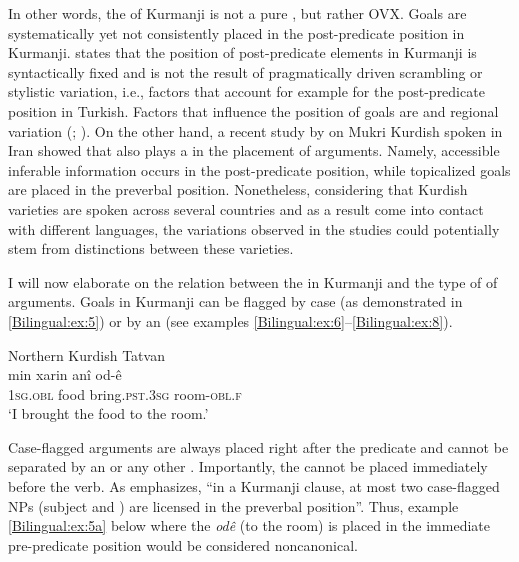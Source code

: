 \documentclass[output=paper,colorlinks,citecolor=brown]{langscibook}
\begin{document}
In other words, the  of Kurmanji is not a pure , but rather OVX. Goals are systematically yet not consistently placed in the post-predicate position in Kurmanji. \citet{Haig2022PostPredicateCon} states that the position of post-predicate elements in Kurmanji is syntactically fixed and is not the result of pragmatically driven scrambling or stylistic variation, i.e., factors that account for example for the post-predicate position in Turkish. Factors that influence the position of goals are  and regional variation (\citealt{haig_verb-goal_2015}; \citealt{gundogdu2019asymmetries}). On the other hand, a recent study by \citet{asadpour_typologizing_2022} on Mukri Kurdish spoken in Iran showed that  also plays a  in the placement of  arguments. Namely, accessible inferable information occurs in the post-predicate position, while topicalized goals are placed in the preverbal position. Nonetheless, considering that Kurdish varieties are spoken across several countries and as a result come into contact with different languages, the variations observed in the studies could potentially stem from distinctions between these varieties.

I will now elaborate on the relation between the  in Kurmanji and the type of  of  arguments. Goals in Kurmanji can be flagged by case (as demonstrated in \ref{Bilingual:ex:5}) or by an  (see examples \ref{Bilingual:ex:6}–\ref{Bilingual:ex:8}). 

\ea\label{Bilingual:ex:5}
Northern Kurdish Tatvan \citep[K024]{matras2016dialects} \\
\gll min xarin anî od-ê \\
\textsc{1sg.obl} food bring\textsc{.pst.3sg} room\textsc{-obl.f} \\
\glt `I brought the food to the room.' 
\z

Case-flagged  arguments are always placed right after the predicate and cannot be separated by an  or any other . Importantly, the   cannot be placed immediately before the verb. As \citet[110]{gundogdu2019asymmetries} emphasizes, ``in a Kurmanji clause, at most two case-flagged NPs (subject and ) are licensed in the preverbal position”. Thus, example \ref{Bilingual:ex:5a} below where the  \textit{odê} (to the room) is placed in the immediate pre-predicate position would be considered noncanonical. 
\end{document}
